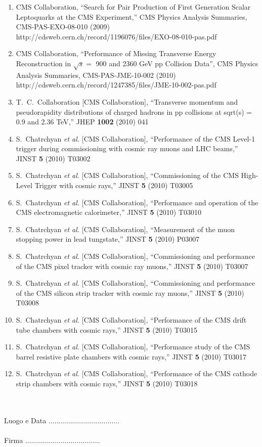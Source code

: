 \documentclass[10pt]{letter}
\begin{document}
\begin{enumerate}
\item CMS Collaboration, 
  ``Search for Pair Production of First Generation Scalar Leptoquarks at the CMS Experiment,''
  CMS Physics Analysis Summaries, CMS-PAS-EXO-08-010 (2009) \\
  http://cdsweb.cern.ch/record/1196076/files/EXO-08-010-pas.pdf 
\item CMS Collaboration,
  ``Performance of Missing Transverse Energy Reconstruction in $\sqrt{s}=$ 900 and 2360 GeV pp Collision Data'',
  CMS Physics Analysis Summaries, CMS-PAS-JME-10-002 (2010) \\
  http://cdsweb.cern.ch/record/1247385/files/JME-10-002-pas.pdf
\item T.~C.~Collaboration  [CMS Collaboration],
  ``Transverse momentum and pseudorapidity distributions of charged hadrons in pp collisions at sqrt(s) = 0.9 and 2.36 TeV,''
  JHEP {\bf 1002} (2010) 041
\item S.~Chatrchyan {\it et al.}  [CMS Collaboration],
  ``Performance of the CMS Level-1 trigger during commissioning with cosmic ray muons and LHC beams,''
  JINST {\bf 5} (2010) T03002
\item S.~Chatrchyan {\it et al.}  [CMS Collaboration],
  ``Commissioning of the CMS High-Level Trigger with cosmic rays,''
  JINST {\bf 5} (2010) T03005
\item S.~Chatrchyan {\it et al.}  [CMS Collaboration],
  ``Performance and operation of the CMS electromagnetic calorimeter,''
  JINST {\bf 5} (2010) T03010
\item S.~Chatrchyan {\it et al.}  [CMS Collaboration],
  ``Measurement of the muon stopping power in lead tungstate,''
  JINST {\bf 5} (2010) P03007
\item S.~Chatrchyan {\it et al.}  [CMS Collaboration],
  ``Commissioning and performance of the CMS pixel tracker with cosmic ray muons,''
  JINST {\bf 5} (2010) T03007
\item S.~Chatrchyan {\it et al.}  [CMS Collaboration],
  ``Commissioning and performance of the CMS silicon strip tracker with cosmic ray muons,''
  JINST {\bf 5} (2010) T03008
\item S.~Chatrchyan {\it et al.}  [CMS Collaboration],
  ``Performance of the CMS drift tube chambers with cosmic rays,''
  JINST {\bf 5} (2010) T03015
\item S.~Chatrchyan {\it et al.}  [CMS Collaboration],
  ``Performance study of the CMS barrel resistive plate chambers with cosmic rays,''
  JINST {\bf 5} (2010) T03017
\item S.~Chatrchyan {\it et al.}  [CMS Collaboration],
  ``Performance of the CMS cathode strip chambers with cosmic rays,''
  JINST {\bf 5} (2010) T03018
\end{enumerate}

~\\
~\\
Luogo e Data .................................... \\ \\

Firma ......................................
\end{document}
